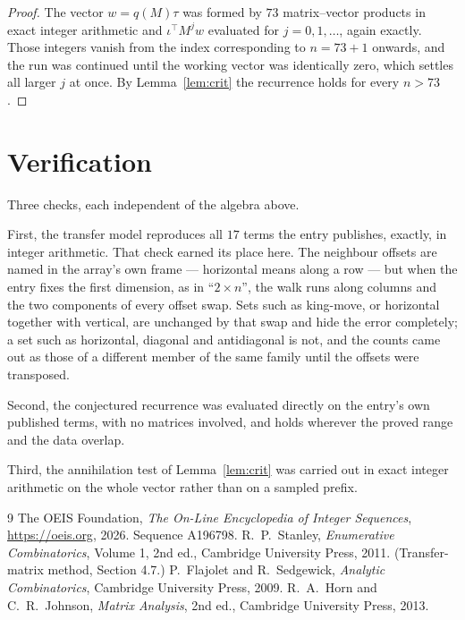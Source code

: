 \documentclass[11pt,a4paper]{article}
\theoremstyle{plain}
\theoremstyle{definition}
\begin{document}
\begin{proof}
The vector $w=q(M)\tau$ was formed by $73$ matrix--vector products in exact integer
arithmetic and $\iota^{\!\top}M^{j}w$ evaluated for $j=0,1,\dots$, again exactly. Those
integers vanish from the index corresponding to $n=73+1$ onwards, and the run was
continued until the working vector was identically zero, which settles all larger $j$ at once.
By Lemma~\ref{lem:crit} the recurrence holds for every $n>73$.
\end{proof}

\section{Verification}

Three checks, each independent of the algebra above.

First, the transfer model reproduces all $17$ terms the entry publishes, exactly, in
integer arithmetic. That check earned its place here. The neighbour offsets are named in the
array's own frame --- horizontal means along a row --- but when the entry fixes the first
dimension, as in ``$2\times n$'', the walk runs along columns and the two components of every
offset swap. Sets such as king-move, or horizontal together with vertical, are unchanged by
that swap and hide the error completely; a set such as horizontal, diagonal and antidiagonal
is not, and the counts came out as those of a different member of the same family until the
offsets were transposed.

Second, the conjectured recurrence was evaluated directly on the entry's own published terms,
with no matrices involved, and holds wherever the proved range and the data overlap.

Third, the annihilation test of Lemma~\ref{lem:crit} was carried out in exact integer
arithmetic on the whole vector rather than on a sampled prefix.

\begin{thebibliography}{9}
 The OEIS Foundation, \emph{The On-Line Encyclopedia of Integer
Sequences}, \url{https://oeis.org}, 2026. Sequence A196798.
 R.~P.~Stanley, \emph{Enumerative Combinatorics}, Volume 1, 2nd ed.,
Cambridge University Press, 2011. (Transfer-matrix method, Section 4.7.)
 P.~Flajolet and R.~Sedgewick, \emph{Analytic Combinatorics}, Cambridge
University Press, 2009.
 R.~A.~Horn and C.~R.~Johnson, \emph{Matrix Analysis}, 2nd ed., Cambridge
University Press, 2013.
\end{thebibliography}
\end{document}
